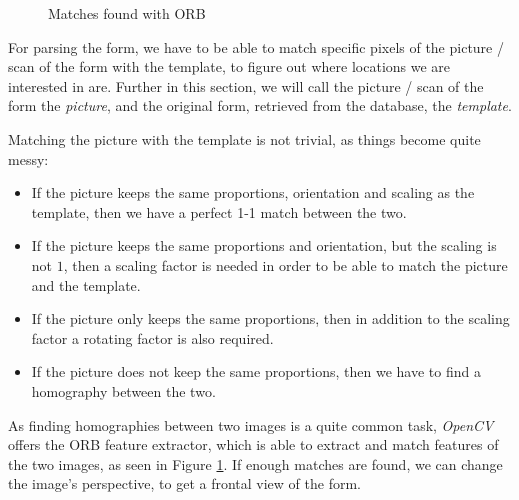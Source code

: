 \documentclass[11pt, a4paper]{report}
\begin{document}
 \begin{figure}[!h]
     \centering
     \caption{Matches found with ORB}
     \label{orb-matches}
 \end{figure}

For parsing the form, we have to be able to match specific pixels of the picture / scan of the form with the template, to figure out where locations we are interested in are. Further in this section, we will call the picture / scan of the form the \textit{picture}, and the original form, retrieved from the database, the \textit{template}.

Matching the picture with the template is not trivial, as things become quite messy:
\begin{itemize}
    \item If the picture keeps the same proportions, orientation and scaling as the template, then we have a perfect 1-1 match between the two.
    \item If the picture keeps the same proportions and orientation, but the scaling is not $1$, then a scaling factor is needed in order to be able to match the picture and the template.
    \item If the picture only keeps the same proportions, then in addition to the scaling factor a rotating factor is also required.
    \item If the picture does not keep the same proportions, then we have to find a homography between the two.
\end{itemize}

As finding homographies between two images is a quite common task, \textit{OpenCV} offers the ORB feature extractor\cite{rublee2011orb}, which is able to extract and match features of the two images, as seen in Figure \ref{orb-matches}. If enough matches are found, we can change the image's perspective, to get a frontal view of the form.
\end{document}
